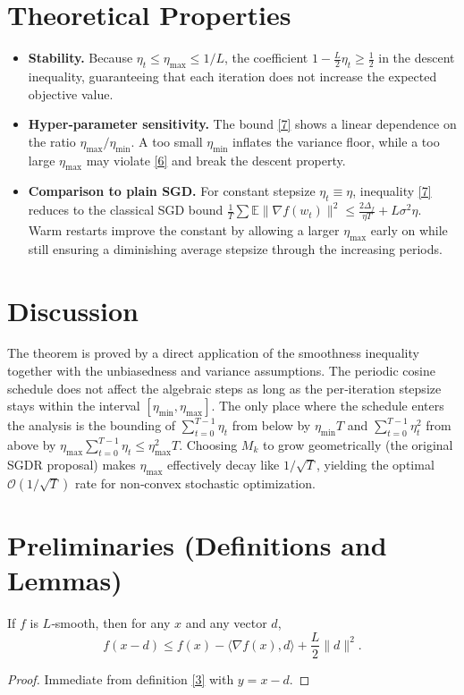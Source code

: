 \documentclass{article}
\begin{document}
\section*{Theoretical Properties}
\begin{itemize}
  \item \textbf{Stability.} Because $\eta_t\le\eta_{\max}\le1/L$, the
    coefficient $1-\frac{L}{2}\eta_t\ge\frac12$ in the descent
    inequality, guaranteeing that each iteration does not increase the
    expected objective value.
  \item \textbf{Hyper‑parameter sensitivity.}
    The bound \eqref{7} shows a linear dependence on the ratio
    $\eta_{\max}/\eta_{\min}$.  A too small $\eta_{\min}$ inflates the
    variance floor, while a too large $\eta_{\max}$ may violate
    \eqref{6} and break the descent property.
  \item \textbf{Comparison to plain SGD.}
    For constant stepsize $\eta_t\equiv\eta$, inequality \eqref{7}
    reduces to the classical SGD bound
    $\frac{1}{T}\sum\mathbb{E}\|\nabla f(w_t)\|^2
     \le \frac{2\Delta_f}{\eta T}+L\sigma^2\eta$.
    Warm restarts improve the constant by allowing a larger
    $\eta_{\max}$ early on while still ensuring a diminishing average
    stepsize through the increasing periods.
\end{itemize}

\section*{Discussion}
The theorem is proved by a direct application of the smoothness
inequality together with the unbiasedness and variance assumptions.
The periodic cosine schedule does not affect the algebraic steps as long
as the per‑iteration stepsize stays within the interval
$[\eta_{\min},\eta_{\max}]$.  The only place where the schedule enters the
analysis is the bounding of $\sum_{t=0}^{T-1}\eta_t$ from below by
$\eta_{\min}T$ and $\sum_{t=0}^{T-1}\eta_t^{2}$ from above by
$\eta_{\max}\sum_{t=0}^{T-1}\eta_t\le\eta_{\max}^{2}T$.
Choosing $M_k$ to grow geometrically (the original SGDR proposal)
makes $\eta_{\max}$ effectively decay like $1/\sqrt{T}$, yielding the
optimal $\mathcal{O}(1/\sqrt{T})$ rate for non‑convex stochastic
optimization.

\section*{Preliminaries (Definitions and Lemmas)}
\begin{lemma}\label{lem:descent}
If $f$ is $L$‑smooth, then for any $x$ and any vector $d$,
\[
f(x-d)\le f(x)-\langle\nabla f(x),d\rangle+\frac{L}{2}\|d\|^{2}.
\tag{8}
\]
\end{lemma}
\begin{proof}
Immediate from definition \eqref{3} with $y=x-d$.
\end{proof}
\end{document}
